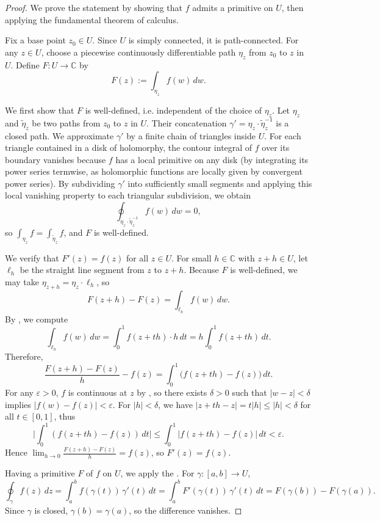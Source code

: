 \begin{proof}
We prove the statement by showing that $f$ admits a primitive on $U$, then applying the fundamental theorem of calculus.

Fix a base point $z_0 \in U$. Since $U$ is simply connected, it is path-connected. For any $z \in U$, choose a piecewise continuously differentiable path $\eta_z$ from $z_0$ to $z$ in $U$. Define $F : U \to \mathbb{C}$ by
$$F(z) := \int_{\eta_z} f(w)\,dw.$$

We first show that $F$ is well-defined, i.e. independent of the choice of $\eta_z$. Let $\eta_z$ and $\tilde{\eta}_z$ be two paths from $z_0$ to $z$ in $U$. Their concatenation $\gamma' = \eta_z \cdot \tilde{\eta}_z^{-1}$ is a closed path. We approximate $\gamma'$ by a finite chain of triangles inside $U$. For each triangle contained in a disk of holomorphy, the contour integral of $f$ over its boundary vanishes because $f$ has a local primitive on any disk (by integrating its power series termwise, as holomorphic functions are locally given by convergent power series). By subdividing $\gamma'$ into sufficiently small segments and applying this local vanishing property to each triangular subdivision, we obtain
$$\oint_{\eta_z \cdot \tilde{\eta}_z^{-1}} f(w)\,dw = 0,$$
so $\int_{\eta_z} f = \int_{\tilde{\eta}_z} f$, and $F$ is well-defined.

We verify that $F'(z) = f(z)$ for all $z \in U$. For small $h \in \mathbb{C}$ with $z + h \in U$, let $\ell_h$ be the straight line segment from $z$ to $z + h$. Because $F$ is well-defined, we may take $\eta_{z+h} = \eta_z \cdot \ell_h$, so
$$F(z + h) - F(z) = \int_{\ell_h} f(w)\,dw.$$
By , we compute
$$\int_{\ell_h} f(w)\,dw = \int_0^1 f(z + th) \cdot h \,dt = h \int_0^1 f(z + th)\,dt.$$
Therefore,
$$\frac{F(z + h) - F(z)}{h} - f(z) = \int_0^1 \bigl(f(z + th) - f(z)\bigr)\,dt.$$
For any $\varepsilon > 0$, $f$ is continuous at $z$ by , so there exists $\delta > 0$ such that $|w - z| < \delta$ implies $|f(w) - f(z)| < \varepsilon$. For $|h| < \delta$, we have $|z + th - z| = t|h| \leq |h| < \delta$ for all $t \in [0,1]$, thus
$$\bigl|\int_0^1 (f(z + th) - f(z))\,dt\bigr| \leq \int_0^1 |f(z + th) - f(z)|\,dt < \varepsilon.$$
Hence $\lim_{h \to 0} \frac{F(z + h) - F(z)}{h} = f(z)$, so $F'(z) = f(z)$.

Having a primitive $F$ of $f$ on $U$, we apply the . For $\gamma : [a,b] \to U$,
$$\oint_{\gamma} f(z)\,dz = \int_a^b f(\gamma(t))\,\gamma'(t)\,dt = \int_a^b F'(\gamma(t))\,\gamma'(t)\,dt = F(\gamma(b)) - F(\gamma(a)).$$
Since $\gamma$ is closed, $\gamma(b) = \gamma(a)$, so the difference vanishes.
\end{proof}